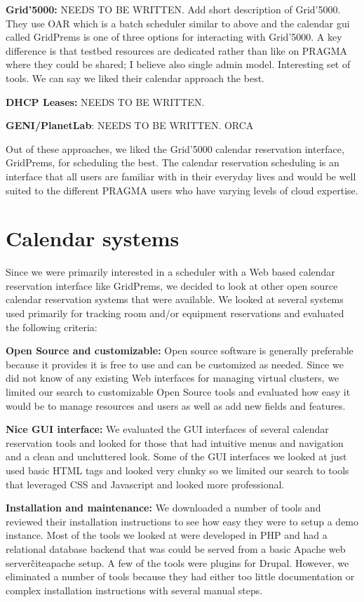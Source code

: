 \documentclass{acm_proc_article-sp}
\begin{document}
\textbf{Grid'5000:}   NEEDS TO BE WRITTEN.  Add short description of Grid'5000.  They use OAR which is a batch scheduler similar to above and the calendar gui called GridPrems is one of three options for interacting with Grid'5000.  A key difference is that testbed resources are dedicated rather than like on PRAGMA where they could be shared;  I believe also single admin model.  Interesting set of tools.  We can say we liked their calendar approach the best.

\textbf{DHCP Leases:}  NEEDS TO BE WRITTEN.

\textbf{GENI/PlanetLab}:  NEEDS TO BE WRITTEN.  ORCA

Out of these approaches, we liked the Grid'5000 calendar reservation interface, GridPrems, for scheduling the best.  The calendar reservation scheduling is an interface that all users are familiar with in their everyday lives and would be well suited to the different PRAGMA users who have varying levels of cloud expertise.  

\section{Calendar systems}
\label{Sec:Calendars}

Since we were primarily interested in a scheduler with a Web based calendar reservation interface like GridPrems, we decided to look at other open source calendar reservation systems that were available.  We looked at several systems used primarily for tracking room and/or equipment reservations and evaluated the following criteria:

\textbf{Open Source and customizable:}  Open source software is generally preferable because it provides it is free to use and can be customized as needed.  Since we did not know of any existing Web interfaces for managing virtual clusters, we limited our search to customizable Open Source tools and evaluated how easy it would be to manage resources and users as well as add new fields and features. 

\textbf{Nice GUI interface:}  We evaluated the GUI interfaces of several calendar reservation tools and looked for those that had intuitive menus and navigation and  a clean and uncluttered look.  Some of the GUI interfaces we looked at just used basic HTML tags and looked very clunky so we limited our search to tools that leveraged CSS and Javascript and looked more professional.   

\textbf{Installation and maintenance:}  We downloaded a number of tools and reviewed their installation instructions to see how easy they were to setup a demo instance.  Most of the tools we looked at were developed in PHP and had a relational database backend that was could be served from a basic  Apache web server\~cite{apache} setup.   A few of the tools were plugins for Drupal.  However, we eliminated a number of tools because they had either too little documentation or complex installation instructions with several manual steps.   
\end{document}

